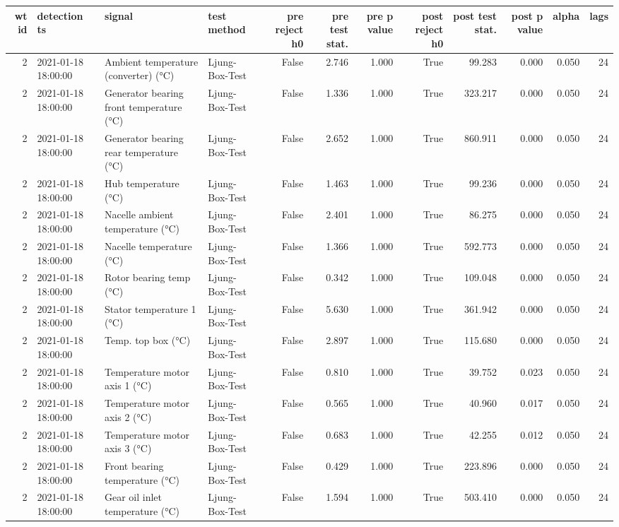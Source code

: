 \begin{tabular}{rlllrrrrrrrr}
\toprule
wt id & detection ts & signal & test method & pre reject h0 & pre test stat. & pre p value & post reject h0 & post test stat. & post p value & alpha & lags \\
\midrule
2 & 2021-01-18 18:00:00 & Ambient temperature (converter) (°C) & Ljung-Box-Test & False & 2.746 & 1.000 & True & 99.283 & 0.000 & 0.050 & 24 \\
2 & 2021-01-18 18:00:00 & Generator bearing front temperature (°C) & Ljung-Box-Test & False & 1.336 & 1.000 & True & 323.217 & 0.000 & 0.050 & 24 \\
2 & 2021-01-18 18:00:00 & Generator bearing rear temperature (°C) & Ljung-Box-Test & False & 2.652 & 1.000 & True & 860.911 & 0.000 & 0.050 & 24 \\
2 & 2021-01-18 18:00:00 & Hub temperature (°C) & Ljung-Box-Test & False & 1.463 & 1.000 & True & 99.236 & 0.000 & 0.050 & 24 \\
2 & 2021-01-18 18:00:00 & Nacelle ambient temperature (°C) & Ljung-Box-Test & False & 2.401 & 1.000 & True & 86.275 & 0.000 & 0.050 & 24 \\
2 & 2021-01-18 18:00:00 & Nacelle temperature (°C) & Ljung-Box-Test & False & 1.366 & 1.000 & True & 592.773 & 0.000 & 0.050 & 24 \\
2 & 2021-01-18 18:00:00 & Rotor bearing temp (°C) & Ljung-Box-Test & False & 0.342 & 1.000 & True & 109.048 & 0.000 & 0.050 & 24 \\
2 & 2021-01-18 18:00:00 & Stator temperature 1 (°C) & Ljung-Box-Test & False & 5.630 & 1.000 & True & 361.942 & 0.000 & 0.050 & 24 \\
2 & 2021-01-18 18:00:00 & Temp. top box (°C) & Ljung-Box-Test & False & 2.897 & 1.000 & True & 115.680 & 0.000 & 0.050 & 24 \\
2 & 2021-01-18 18:00:00 & Temperature motor axis 1 (°C) & Ljung-Box-Test & False & 0.810 & 1.000 & True & 39.752 & 0.023 & 0.050 & 24 \\
2 & 2021-01-18 18:00:00 & Temperature motor axis 2 (°C) & Ljung-Box-Test & False & 0.565 & 1.000 & True & 40.960 & 0.017 & 0.050 & 24 \\
2 & 2021-01-18 18:00:00 & Temperature motor axis 3 (°C) & Ljung-Box-Test & False & 0.683 & 1.000 & True & 42.255 & 0.012 & 0.050 & 24 \\
2 & 2021-01-18 18:00:00 & Front bearing temperature (°C) & Ljung-Box-Test & False & 0.429 & 1.000 & True & 223.896 & 0.000 & 0.050 & 24 \\
2 & 2021-01-18 18:00:00 & Gear oil inlet temperature (°C) & Ljung-Box-Test & False & 1.594 & 1.000 & True & 503.410 & 0.000 & 0.050 & 24 \\

\end{tabular}
